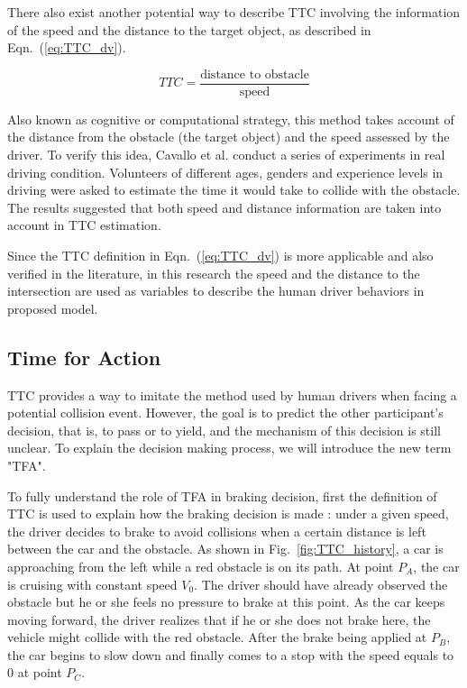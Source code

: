 There also exist another potential way to describe TTC involving the information of the speed and the distance to the target object, as described in Eqn.~(\ref{eq:TTC_dv}).

\begin{equation}
TTC = \frac{\text{distance to obstacle}}{\text{speed}}
\label{eq:TTC_dv}
\end{equation}

Also known as cognitive or computational strategy, this method takes account of the distance from the obstacle (the target object) and the speed assessed by the driver. To verify this idea, Cavallo et al. \cite{TTC} conduct a series of experiments in real driving condition. Volunteers of different ages, genders and experience levels in driving were asked to estimate the time it would take to collide with the obstacle. The results suggested that both speed and distance information are taken into account in TTC estimation. 

Since the TTC definition in Eqn.~(\ref{eq:TTC_dv}) is more applicable and also verified in the literature, in this research the speed and the distance to the intersection are used as variables to describe the human driver behaviors in proposed model. 


\subsection{Time for Action}
\label{sub:TFA}

TTC provides a way to imitate the method used by human drivers when facing a potential collision event. However, the goal is to predict the other participant's decision, that is, to pass or to yield, and the mechanism of this decision is still unclear. To explain the decision making process, we will introduce the new term "\ac{TFA}".

To fully understand the role of TFA in braking decision, first the definition of TTC is used to explain how the braking decision is made : under a given speed, the driver decides to brake to avoid collisions when a certain distance is left between the car and the obstacle. As shown in Fig.~\ref{fig:TTC_history}, a car is approaching from the left while a red obstacle is on its path. At point $P_A$, the car is cruising with constant speed $V_0$. The driver should have already observed the obstacle but he or she feels no pressure to brake at this point. As the car keeps moving forward, the driver realizes that if he or she does not brake here, the vehicle might collide with the red obstacle. After the brake being applied at $P_B$, the car begins to slow down and finally comes to a stop with the speed equals to $0$ at point $P_C$. 

